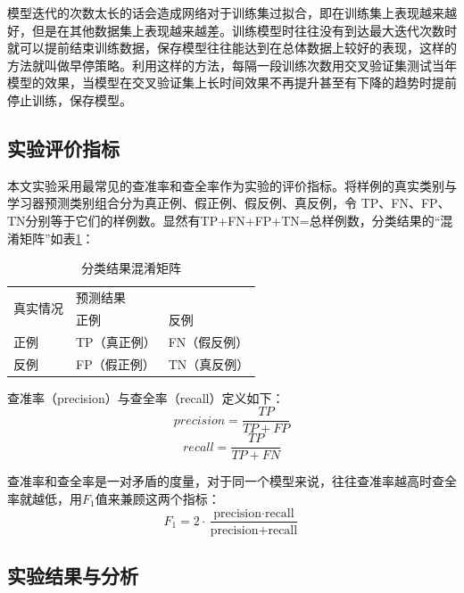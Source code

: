 \documentclass[winfonts,master,oneside,nobackinfo]{njuthesis}
\begin{document}
模型迭代的次数太长的话会造成网络对于训练集过拟合，即在训练集上表现越来越好，但是在其他数据集上表现越来越差。训练模型时往往没有到达最大迭代次数时就可以提前结束训练数据，保存模型往往能达到在总体数据上较好的表现，这样的方法就叫做早停策略。利用这样的方法，每隔一段训练次数用交叉验证集测试当年模型的效果，当模型在交叉验证集上长时间效果不再提升甚至有下降的趋势时提前停止训练，保存模型。

\subsection{实验评价指标}

本文实验采用最常见的查准率和查全率作为实验的评价指标。将样例的真实类别与学习器预测类别组合分为真正例、假正例、假反例、真反例，令
TP、FN、FP、TN分别等于它们的样例数。显然有TP+FN+FP+TN=总样例数，分类结果的“混淆矩阵”如表\ref{mix-matrix}：

\begin{table}[h]
\centering
\begin{tabular}{|l|l|l|}
\hline
\multirow{2}{*}{真实情况} & \multicolumn{2}{l|}{预测结果} \\ \cline{2-3} 
                      & 正例          & 反例          \\ \hline
正例                    & TP（真正例）     & FN（假反例）     \\ \hline
反例                    & FP（假正例）     & TN（真反例）     \\ \hline
\end{tabular}
\caption{分类结果混淆矩阵}
\label{mix-matrix}
\end{table}

查准率（precision）与查全率（recall）定义如下：
\begin{equation}
precision =\frac{T P}{T P+F P}
\end{equation}
\begin{equation}
recall=\frac{T P}{T P+F N}
\end{equation}

查准率和查全率是一对矛盾的度量，对于同一个模型来说，往往查准率越高时查全率就越低，用$F_{1}$值来兼顾这两个指标：
\begin{equation}
F_{1}=2 \cdot \frac{\text {precision} \cdot \text {recall}}{\text {precision}+\text {recall}}
\end{equation}
\subsection{实验结果与分析}
\end{document}
